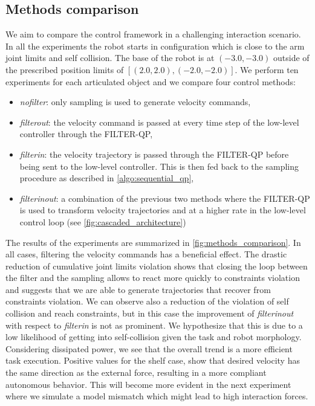 \subsection{Methods comparison}
We aim to compare the control framework in a challenging interaction scenario. In all the experiments the robot starts in configuration which is close to the arm joint limits and self collision. The base of the robot is at $(-3.0, -3.0)$ outside of the prescribed position limits of $[(2.0, 2.0), (-2.0, -2.0)]$. We perform ten experiments for each articulated object and we compare four control methods:
\begin{itemize}
    \item \textit{no\textunderscore filter}: only sampling is used to generate velocity commands,
    \item \textit{filter\textunderscore out}: the velocity command is passed at every time step of the low-level controller through the FILTER-QP,
    \item \textit{filter\textunderscore in}: the velocity trajectory is passed through the FILTER-QP before being sent to the low-level controller. This is then fed back to the sampling procedure as described in \algo \ref{algo:sequential_qp},
    \item \textit{filter\textunderscore in\textunderscore out}: a combination of the previous two methods where the FILTER-QP is used to transform velocity trajectories and at a higher rate in the low-level control loop (see \fig \ref{fig:cascaded_architecture})
\end{itemize}
The results of the experiments are summarized in \fig \ref{fig:methods_comparison}. In all cases, filtering the velocity commands has a beneficial effect. The drastic reduction of cumulative joint limits violation shows that closing the loop between the filter and the sampling allows to react more quickly to constraints violation and suggests that we are able to generate trajectories that recover from constraints violation. We can observe also a reduction of the violation of self collision and reach constraints, but in this case the improvement of  \textit{filter\textunderscore in\textunderscore out} with respect to \textit{filter\textunderscore in} is not as prominent. We hypothesize that this is due to a low likelihood of getting into self-collision given the task and robot morphology. Considering dissipated power, we see that the overall trend is a more efficient task execution. Positive values for the shelf case, show that desired velocity has the same direction as the external force, resulting in a more compliant autonomous behavior. This will become more evident in the next experiment where we simulate a model mismatch which might lead to high interaction forces. 

